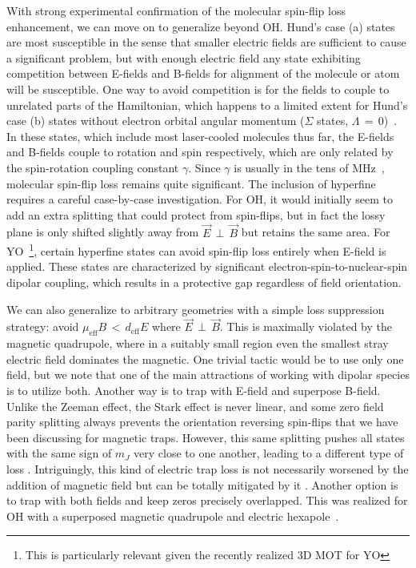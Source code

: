 \documentclass[%
 reprint,
 amsmath,amssymb,
 aps,
prl,
]{revtex4-1}
\newcommand{\epb}{{$\vec{E}\,{\perp}\,\vec{B}$}}
\begin{document}
With strong experimental confirmation of the molecular spin-flip loss enhancement, we can move on to generalize beyond OH.
Hund's case (a) states are most susceptible in the sense that smaller electric fields are sufficient to cause a significant problem, but with enough electric field any state exhibiting competition between E-fields and B-fields for alignment of the molecule or atom will be susceptible. 
One way to avoid competition is for the fields to couple to unrelated parts of the Hamiltonian, which happens to a limited extent for Hund's case (b) states without electron orbital angular momentum ($\Sigma$ states, $\Lambda\,{=}\,0$)~\cite{Bohn2013}. 
In these states, which include most laser-cooled molecules thus far, the E-fields and B-fields couple to rotation and spin respectively, which are only related by the spin-rotation coupling constant $\gamma$.
Since $\gamma$ is usually in the tens of MHz~\cite{Quemener2016}, molecular spin-flip loss remains quite significant.
The inclusion of hyperfine requires a careful case-by-case investigation. For OH, it would initially seem to add an extra splitting that could protect from spin-flips, but in fact the lossy plane is only shifted slightly away from \epb{} but retains the same area.
For YO~\footnote{This is particularly relevant given the recently realized 3D MOT for YO}, certain hyperfine states can avoid spin-flip loss entirely when E-field is applied. 
These states are characterized by significant electron-spin-to-nuclear-spin dipolar coupling, which results in a protective gap regardless of field orientation. %

We can also generalize to arbitrary geometries with a simple loss suppression strategy: avoid $\mu_\text{eff}B \,{<}\, d_\text{eff}E$ where \epb.
This is maximally violated by the magnetic quadrupole, where in a suitably small region even the smallest stray electric field dominates the magnetic.
One trivial tactic would be to use only one field, but we note that one of the main attractions of working with dipolar species is to utilize both.
Another way is to trap with E-field and superpose B-field.
Unlike the Zeeman effect, the Stark effect is never linear, and some zero field parity splitting always prevents the orientation reversing spin-flips that we have been discussing for magnetic traps. 
However, this same splitting pushes all states with the same sign of $m_J$ very close to one another, leading to a different type of loss \cite{Wall2010}.
Intriguingly, this kind of electric trap loss is not necessarily worsened by the addition of magnetic field but can be totally mitigated by it \cite{Meek2011}.
Another option is to trap with both fields and keep zeros precisely overlapped. 
This was realized for OH with a superposed magnetic quadrupole and electric hexapole~\cite{Sawyer2007}.
\end{document}
